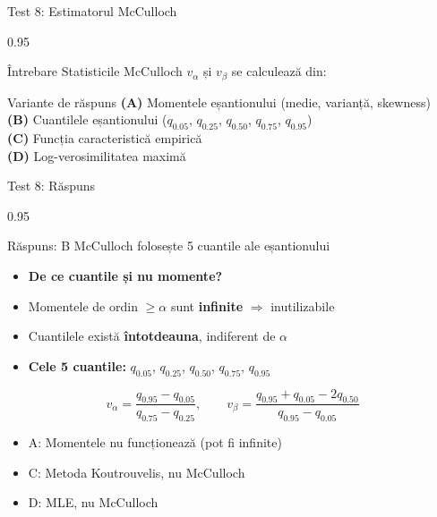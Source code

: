\documentclass[9pt, aspectratio=169, t]{beamer}
\begin{document}
\begin{frame}{Test 8: Estimatorul McCulloch}
\begin{cminipage}{0.95\textwidth}
    \begin{alertblock}{Întrebare}
        Statisticile McCulloch $v_\alpha$ și $v_\beta$ se calculează din:
    \end{alertblock}

    \vspace{0.5cm}
    \begin{block}{Variante de răspuns}
    \textcolor{MainBlue}{\textbf{(A)}} Momentele eșantionului (medie, varianță, skewness)\\[3pt]
    \textcolor{MainBlue}{\textbf{(B)}} Cuantilele eșantionului ($q_{0.05}$, $q_{0.25}$, $q_{0.50}$, $q_{0.75}$, $q_{0.95}$)\\[3pt]
    \textcolor{MainBlue}{\textbf{(C)}} Funcția caracteristică empirică\\[3pt]
    \textcolor{MainBlue}{\textbf{(D)}} Log-verosimilitatea maximă
    \end{block}
\end{cminipage}
\end{frame}

\begin{frame}{Test 8: Răspuns}
\begin{cminipage}{0.95\textwidth}
    \begin{exampleblock}{Răspuns: B}
        McCulloch folosește 5 cuantile ale eșantionului
    \end{exampleblock}

    \vspace{0.2cm}

    \begin{itemize}\setlength{\itemsep}{0pt}
        \item \textbf{De ce cuantile și nu momente?}
        \item Momentele de ordin $\geq \alpha$ sunt \textbf{infinite} $\Rightarrow$ inutilizabile
        \item Cuantilele există \textbf{întotdeauna}, indiferent de $\alpha$
        \item \textbf{Cele 5 cuantile:} $q_{0.05}$, $q_{0.25}$, $q_{0.50}$, $q_{0.75}$, $q_{0.95}$
    \end{itemize}
    $$v_\alpha = \frac{q_{0.95} - q_{0.05}}{q_{0.75} - q_{0.25}}, \qquad v_\beta = \frac{q_{0.95} + q_{0.05} - 2q_{0.50}}{q_{0.95} - q_{0.05}}$$
    \begin{itemize}\setlength{\itemsep}{0pt}
        \item A: Momentele nu funcționează (pot fi infinite) \incorrect
        \item C: Metoda Koutrouvelis, nu McCulloch \incorrect
        \item D: MLE, nu McCulloch \incorrect
    \end{itemize}
\end{cminipage}
\end{frame}
\end{document}
